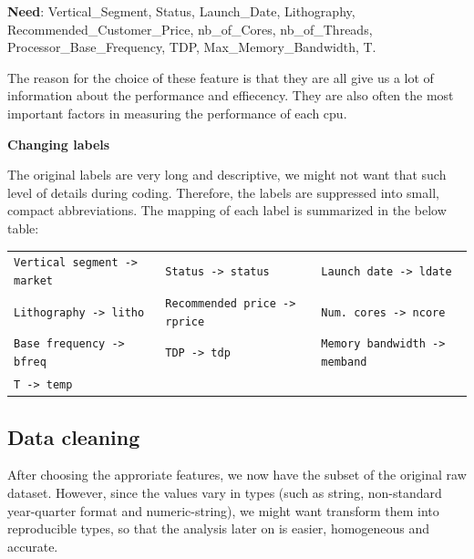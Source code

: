 \textbf{Need}: Vertical\_Segment, Status, Launch\_Date, Lithography, Recommended\_Customer\_Price, nb\_of\_Cores, nb\_of\_Threads, Processor\_Base\_Frequency, TDP, Max\_Memory\_Bandwidth, T.

The reason for the choice of these feature is that they are all give us a lot of information about the performance and effiecency. They are also often the most important factors in measuring the performance of each cpu.


\textbf{Changing labels}

The original labels are very long and descriptive, we might not want that such level of details during coding. Therefore, the labels are suppressed
into small, compact abbreviations. The mapping of each label is summarized in the below table:

\begin{center}
    \begin{tabularx}{\linewidth}{l*{2}{X}}
        \toprule
        \verb|Vertical segment -> market| & \verb|Status -> status|  & \verb|Launch date -> ldate|      \\
        \verb|Lithography -> litho| & \verb|Recommended price -> rprice|  & \verb|Num. cores -> ncore|  \\
        \verb|Base frequency -> bfreq| & \verb|TDP -> tdp|   & \verb|Memory bandwidth -> memband|       \\
        \verb|T -> temp| & &                                                                            \\
        \bottomrule
    \end{tabularx}
\end{center}










\subsection{Data cleaning}
After choosing the approriate features, we now have the subset of the original raw dataset. 
However, since the values vary in types (such as string, non-standard year-quarter format and numeric-string),
we might want transform them into reproducible types, so that the analysis later on is easier, homogeneous and accurate.

